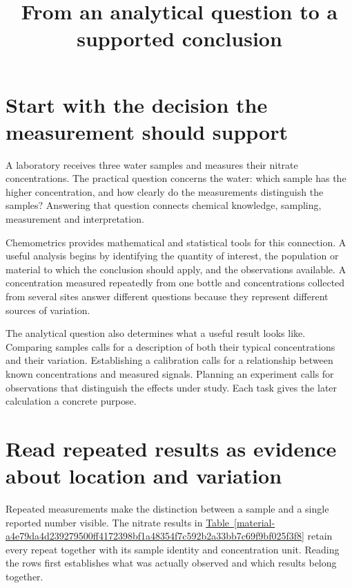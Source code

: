 \documentclass[11pt,a4paper]{article}
\begin{document}
\title{From an analytical question to a supported conclusion}
\author{}
\date{}
\maketitle
\tableofcontents
\clearpage
\section{Start with the decision the measurement should support}
A laboratory receives three water samples and measures their nitrate concentrations. The practical question concerns the water: which sample has the higher concentration, and how clearly do the measurements distinguish the samples? Answering that question connects chemical knowledge, sampling, measurement and interpretation.


Chemometrics provides mathematical and statistical tools for this connection. A useful analysis begins by identifying the quantity of interest, the population or material to which the conclusion should apply, and the observations available. A concentration measured repeatedly from one bottle and concentrations collected from several sites answer different questions because they represent different sources of variation.


The analytical question also determines what a useful result looks like. Comparing samples calls for a description of both their typical concentrations and their variation. Establishing a calibration calls for a relationship between known concentrations and measured signals. Planning an experiment calls for observations that distinguish the effects under study. Each task gives the later calculation a concrete purpose.


\clearpage
\section{Read repeated results as evidence about location and variation}
Repeated measurements make the distinction between a sample and a single reported number visible. The nitrate results in \hyperref[material-a4e79da4d239279500ff4172398bf1a48354f7c592b2a33bb7c69f9bf025f3f8]{Table~\ref*{material-a4e79da4d239279500ff4172398bf1a48354f7c592b2a33bb7c69f9bf025f3f8}} retain every repeat together with its sample identity and concentration unit. Reading the rows first establishes what was actually observed and which results belong together.
\end{document}

